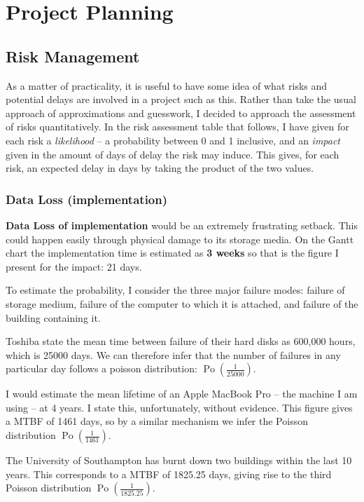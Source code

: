 \chapter{Project Planning}
\section{Risk Management}
As a matter of practicality, it is useful to have some idea of what risks
and potential delays are involved in a project such as this. Rather than
take the usual approach of approximations and guesswork, I decided to
approach the assessment of risks quantitatively. In the risk assessment
table that follows, I have given for each risk a \emph{likelihood} -- a
probability between 0 and 1 inclusive, and an \emph{impact} given in the
amount of days of delay the risk may induce. This gives, for each risk, an
expected delay in days by taking the product of the two values.

\subsection{Data Loss (implementation)}

\textbf{Data Loss of implementation} would be an extremely frustrating
setback. This could happen easily through physical damage to its storage
media. On the Gantt chart the implementation time is estimated as \textbf{3
weeks} so that is the figure I present for the impact: 21 days.

To estimate the probability, I consider the three major failure modes:
failure of storage medium, failure of the computer to which it is attached,
and failure of the building containing it.

Toshiba state the mean time between failure of their hard disks as
600,000 hours, which is 25000 days. We can therefore
infer that the number of failures in any particular day follows a
poisson distribution: $\operatorname{Po}(\frac{1}{25000})$.

I would estimate the mean lifetime of an Apple MacBook Pro -- the machine I
am using -- at 4 years. I state this, unfortunately, without evidence. This
figure gives a MTBF of 1461 days, so by a similar mechanism we infer the
Poisson distribution $\operatorname{Po}(\frac{1}{1461})$.

The University of Southampton has burnt down two buildings within the last
10 years\cite{fireRecord}. This corresponds to a MTBF of 1825.25 days, giving rise to the third
Poisson distribution $\operatorname{Po}(\frac{1}{1825.25})$.

